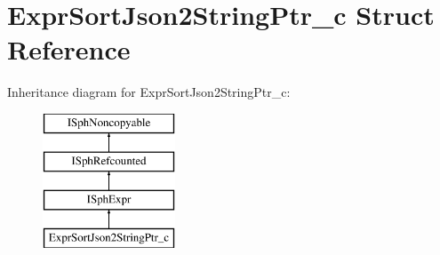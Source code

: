 \hypertarget{structExprSortJson2StringPtr__c}{\section{Expr\-Sort\-Json2\-String\-Ptr\-\_\-c Struct Reference}
\label{structExprSortJson2StringPtr__c}
}
Inheritance diagram for Expr\-Sort\-Json2\-String\-Ptr\-\_\-c\-:\begin{figure}[H]
\begin{center}
\leavevmode
\includegraphics[height=4.000000cm]{structExprSortJson2StringPtr__c}
\end{center}
\end{figure}
